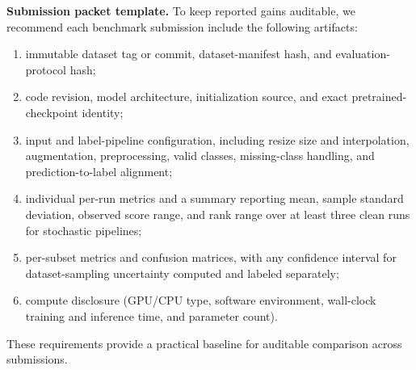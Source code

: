 \documentclass{article}
\begin{document}
\textbf{Submission packet template.} To keep reported gains auditable, we
recommend each benchmark submission include the following artifacts:
\begin{enumerate}[leftmargin=*,nosep]
    \item immutable dataset tag or commit, dataset-manifest hash, and
    evaluation-protocol hash;
    \item code revision, model architecture, initialization source, and exact
    pretrained-checkpoint identity;
    \item input and label-pipeline configuration, including resize size and
    interpolation, augmentation, preprocessing, valid classes, missing-class
    handling, and prediction-to-label alignment;
    \item individual per-run metrics and a summary reporting mean, sample
    standard deviation, observed score range, and rank range over at least
    three clean runs for stochastic pipelines;
    \item per-subset metrics and confusion matrices, with any confidence
    interval for dataset-sampling uncertainty computed and labeled separately;
    \item compute disclosure (GPU/CPU type, software environment, wall-clock
    training and inference time, and parameter count).
\end{enumerate}
These requirements provide a practical baseline for auditable comparison
across submissions.
\end{document}
